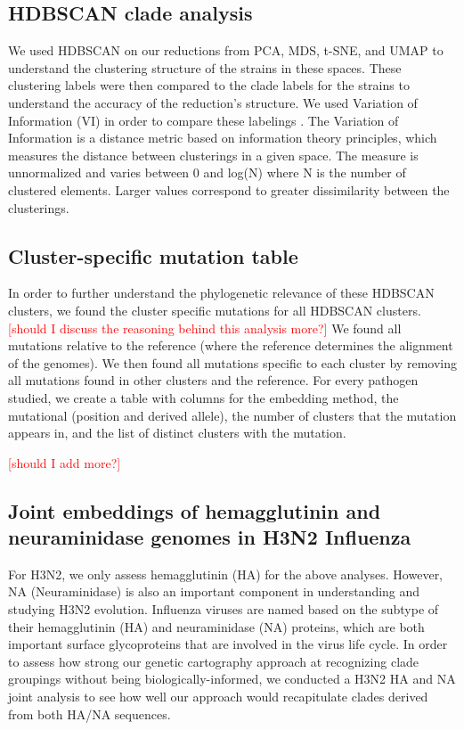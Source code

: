 \documentclass[10pt,letterpaper]{article}
\def\jhc#1{\textcolor{red}{[#1]}}
\begin{document}
\subsection*{HDBSCAN clade analysis}
We used HDBSCAN \citep{campello2015hierarchical} on our reductions from PCA, MDS, t-SNE, and UMAP to understand the clustering structure of the strains in these spaces.
These clustering labels were then compared to the clade labels for the strains to understand the accuracy of the reduction's structure.
We used Variation of Information (VI) in order to compare these labelings \citep{meilua2003comparing}.
The Variation of Information is a distance metric based on information theory principles, which measures the distance between clusterings in a given space.
The measure is unnormalized and varies between 0 and log(N) where N is the number of clustered elements.
Larger values correspond to greater dissimilarity between the clusterings.

\subsection*{Cluster-specific mutation table}
In order to further understand the phylogenetic relevance of these HDBSCAN clusters, we found the cluster specific mutations for all HDBSCAN clusters.
\jhc{should I discuss the reasoning behind this analysis more?}
We found all mutations relative to the reference (where the reference determines the alignment of the genomes).
We then found all mutations specific to each cluster by removing all mutations found in other clusters and the reference.
For every pathogen studied, we create a table with columns for the embedding method, the mutational (position and derived allele), the number of clusters that the mutation appears in, and the list of distinct clusters with the mutation.

\jhc{should I add more?}

\subsection*{Joint embeddings of hemagglutinin and neuraminidase genomes in H3N2 Influenza}

For H3N2, we only assess hemagglutinin (HA) for the above analyses.
However, NA (Neuraminidase) is also an important component in understanding and studying H3N2 evolution.
Influenza viruses are named based on the subtype of their hemagglutinin (HA) and neuraminidase (NA) proteins, which are both important surface glycoproteins that are involved in the virus life cycle.
In order to assess how strong our genetic cartography approach at recognizing clade groupings without being biologically-informed, we conducted a H3N2 HA and NA joint analysis to see how well our approach would recapitulate clades derived from both HA/NA sequences.
\end{document}
